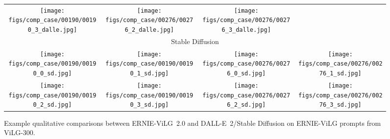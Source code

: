 \documentclass[10pt,twocolumn,letterpaper]{article}
\begin{document}
\begin{CJK*}{UTF8}{gbsn}
\begin{figure*}[htbp]
\begin{tabular}{c@{\hskip 2.5pt}c@{\hskip 8pt}c@{\hskip 2.5pt}c}
{\texttt{[image: figs/comp\_case/00190/00190\_3\_dalle.jpg]}} &
{\texttt{[image: figs/comp\_case/00276/00276\_2\_dalle.jpg]}} &
{\texttt{[image: figs/comp\_case/00276/00276\_3\_dalle.jpg]}} \\
\multicolumn{4}{c}{\scriptsize Stable Diffusion} \\
{\texttt{[image: figs/comp\_case/00190/00190\_0\_sd.jpg]}} &
{\texttt{[image: figs/comp\_case/00190/00190\_1\_sd.jpg]}} &
{\texttt{[image: figs/comp\_case/00276/00276\_0\_sd.jpg]}} &
{\texttt{[image: figs/comp\_case/00276/00276\_1\_sd.jpg]}} \\
{\texttt{[image: figs/comp\_case/00190/00190\_2\_sd.jpg]}} &
{\texttt{[image: figs/comp\_case/00190/00190\_3\_sd.jpg]}} &
{\texttt{[image: figs/comp\_case/00276/00276\_2\_sd.jpg]}} &
{\texttt{[image: figs/comp\_case/00276/00276\_3\_sd.jpg]}} \\
\end{tabular}
\caption{Example qualitative comparisons between ERNIE-ViLG~2.0 and DALL-E~2/Stable Diffusion on ERNIE-ViLG prompts from ViLG-300.}
\label{fig:case_ernie_vilg}
\end{figure*}
\end{CJK*}
\end{document}
